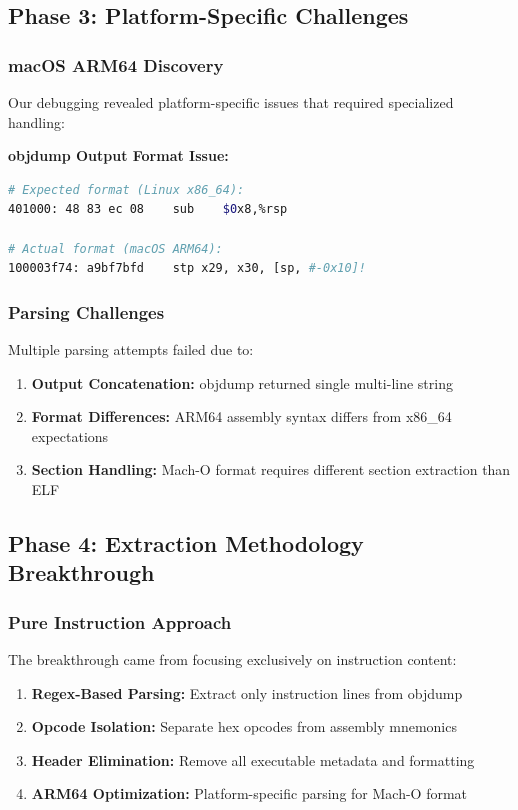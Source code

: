 \documentclass[11pt,a4paper]{article}
\begin{document}
\subsection{Phase 3: Platform-Specific Challenges}
\subsubsection{macOS ARM64 Discovery}
Our debugging revealed platform-specific issues that required specialized handling:

\textbf{objdump Output Format Issue:}
\begin{lstlisting}[language=bash, caption=Platform-specific objdump output differences]
# Expected format (Linux x86_64):
401000: 48 83 ec 08    sub    $0x8,%rsp

# Actual format (macOS ARM64):
100003f74: a9bf7bfd    stp x29, x30, [sp, #-0x10]!
\end{lstlisting}

\subsubsection{Parsing Challenges}
Multiple parsing attempts failed due to:
\begin{enumerate}
    \item \textbf{Output Concatenation:} objdump returned single multi-line string
    \item \textbf{Format Differences:} ARM64 assembly syntax differs from x86\_64 expectations  
    \item \textbf{Section Handling:} Mach-O format requires different section extraction than ELF
\end{enumerate}

\subsection{Phase 4: Extraction Methodology Breakthrough}
\subsubsection{Pure Instruction Approach}
The breakthrough came from focusing exclusively on instruction content:

\begin{enumerate}
    \item \textbf{Regex-Based Parsing:} Extract only instruction lines from objdump
    \item \textbf{Opcode Isolation:} Separate hex opcodes from assembly mnemonics
    \item \textbf{Header Elimination:} Remove all executable metadata and formatting
    \item \textbf{ARM64 Optimization:} Platform-specific parsing for Mach-O format
\end{enumerate}
\end{document}
